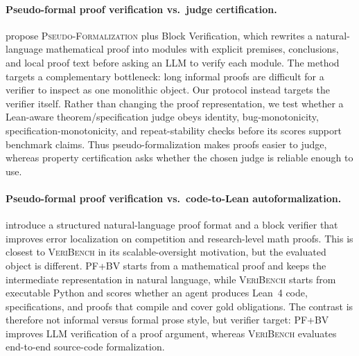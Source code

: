 
\paragraph{Pseudo-formal proof verification vs.\ judge certification.}
\citet{barkallah2026pseudoformalization} propose \textsc{Pseudo-Formalization} plus Block Verification, which rewrites a natural-language mathematical proof into modules with explicit premises, conclusions, and local proof text before asking an LLM to verify each module.
The method targets a complementary bottleneck: long informal proofs are difficult for a verifier to inspect as one monolithic object.
Our protocol instead targets the verifier itself.
Rather than changing the proof representation, we test whether a Lean-aware theorem/specification judge obeys identity, bug-monotonicity, specification-monotonicity, and repeat-stability checks before its scores support benchmark claims.
Thus pseudo-formalization makes proofs easier to judge, whereas property certification asks whether the chosen judge is reliable enough to use.

\paragraph{Pseudo-formal proof verification vs.\ code-to-Lean autoformalization.}
\citet{barkallah2026pseudoformalization} introduce a structured natural-language proof format and a block verifier that improves error localization on competition and research-level math proofs.
This is closest to \textsc{VeriBench} in its scalable-oversight motivation, but the evaluated object is different.
PF+BV starts from a mathematical proof and keeps the intermediate representation in natural language, while \textsc{VeriBench} starts from executable Python and scores whether an agent produces Lean~4 code, specifications, and proofs that compile and cover gold obligations.
The contrast is therefore not informal versus formal prose style, but verifier target: PF+BV improves LLM verification of a proof argument, whereas \textsc{VeriBench} evaluates end-to-end source-code formalization.

